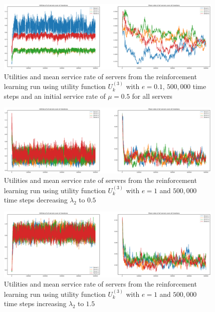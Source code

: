 \begin{figure}[H]
    \includegraphics[width=\textwidth]{chapters/00_appendix/03_more_rl_results/Bin/utility_3_eps/u3_3_initial_05.eps}
    \caption{Utilities and mean service rate of servers from the reinforcement
    learning run using utility function \(U_k^{(3)}\) with \(e = 0.1\),
    \(500,\!000\) time steps and an initial service rate of \(\mu = 0.5\) for all
    servers}
    \label{fig:RL_utility3_3_initial_05}
\end{figure}

\begin{figure}[H]
    \includegraphics[width=\textwidth]{chapters/00_appendix/03_more_rl_results/Bin/utility_3_eps/u3_4_lambda2_05.eps}
    \caption{Utilities and mean service rate of servers from the reinforcement
    learning run using utility function \(U_k^{(3)}\) with \(e = 1\) and
    \(500,\!000\) time steps decreasing \(\lambda_2\) to \(0.5\)}
    \label{fig:RL_utility3_4_lambda2_05}
\end{figure}

\begin{figure}[H]
    \includegraphics[width=\textwidth]{chapters/00_appendix/03_more_rl_results/Bin/utility_3_eps/u3_4_lambda2_15.eps}
    \caption{Utilities and mean service rate of servers from the reinforcement
    learning run using utility function \(U_k^{(3)}\) with \(e = 1\) and
    \(500,\!000\) time steps increasing \(\lambda_2\) to \(1.5\)}
    \label{fig:RL_utility3_4_lambda2_15}
\end{figure}


